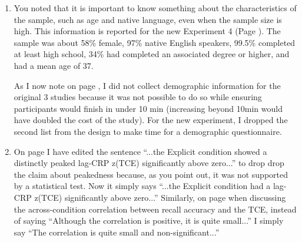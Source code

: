 \documentclass[12pt]{article}
\begin{document}
\begin{enumerate}
\item
	You noted that it is important to know something about the characteristics of the sample, such as age and native language, even when the sample size is high. This information is reported for the new Experiment 4 (Page \pageref{newexp}). The sample was about 58\% female, 97\% native English speakers, 99.5\% completed at least high school, 34\% had completed an associated degree or higher, and had a mean age of 37.

	As I now note on page \pageref{TODO-10}, I did not collect demographic information for the original 3 studies because it was not possible to do so while ensuring participants would finish in under 10 min (increasing beyond 10min would have doubled the cost of the study). For the new experiment, I dropped the second list from the design to make time for a demographic questionnaire. %

\item
	On page \pageref{done-11} I have edited the sentence ``...the Explicit condition showed a distinctly peaked lag-CRP z(TCE) significantly above zero...'' to drop drop the claim about peakedness because, as you point out, it was not supported by a statistical test. Now it simply says ``...the Explicit condition had a lag-CRP z(TCE) significantly above zero...''
	Similarly, on page \pageref{done-12} when discussing the across-condition correlation between recall accuracy and the TCE, instead of saying ``Although the correlation is positive, it is quite small...'' I simply say ``The correlation is quite small and non-significant...'' %


\end{enumerate}
\end{document}
